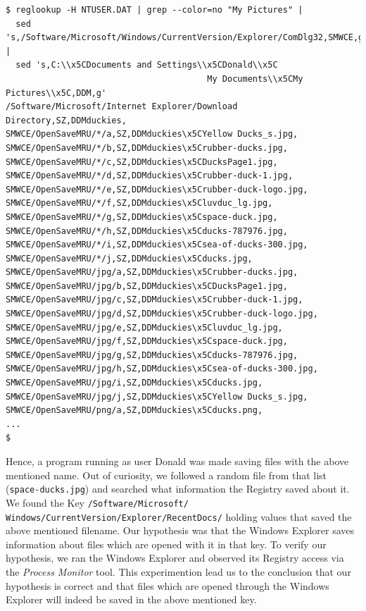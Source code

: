 \documentclass[a4paper,
    11pt,
    normalheadings,
    parindent,
    UKenglish,
    abstracton,
    ]{scrartcl}
\begin{document}
\begin{verbatim}
$ reglookup -H NTUSER.DAT | grep --color=no "My Pictures" |
  sed 's,/Software/Microsoft/Windows/CurrentVersion/Explorer/ComDlg32,SMWCE,g' |
  sed 's,C:\\x5CDocuments and Settings\\x5CDonald\\x5C
                                        My Documents\\x5CMy Pictures\\x5C,DDM,g'
/Software/Microsoft/Internet Explorer/Download Directory,SZ,DDMduckies,
SMWCE/OpenSaveMRU/*/a,SZ,DDMduckies\x5CYellow Ducks_s.jpg,
SMWCE/OpenSaveMRU/*/b,SZ,DDMduckies\x5Crubber-ducks.jpg,
SMWCE/OpenSaveMRU/*/c,SZ,DDMduckies\x5CDucksPage1.jpg,
SMWCE/OpenSaveMRU/*/d,SZ,DDMduckies\x5Crubber-duck-1.jpg,
SMWCE/OpenSaveMRU/*/e,SZ,DDMduckies\x5Crubber-duck-logo.jpg,
SMWCE/OpenSaveMRU/*/f,SZ,DDMduckies\x5Cluvduc_lg.jpg,
SMWCE/OpenSaveMRU/*/g,SZ,DDMduckies\x5Cspace-duck.jpg,
SMWCE/OpenSaveMRU/*/h,SZ,DDMduckies\x5Cducks-787976.jpg,
SMWCE/OpenSaveMRU/*/i,SZ,DDMduckies\x5Csea-of-ducks-300.jpg,
SMWCE/OpenSaveMRU/*/j,SZ,DDMduckies\x5Cducks.jpg,
SMWCE/OpenSaveMRU/jpg/a,SZ,DDMduckies\x5Crubber-ducks.jpg,
SMWCE/OpenSaveMRU/jpg/b,SZ,DDMduckies\x5CDucksPage1.jpg,
SMWCE/OpenSaveMRU/jpg/c,SZ,DDMduckies\x5Crubber-duck-1.jpg,
SMWCE/OpenSaveMRU/jpg/d,SZ,DDMduckies\x5Crubber-duck-logo.jpg,
SMWCE/OpenSaveMRU/jpg/e,SZ,DDMduckies\x5Cluvduc_lg.jpg,
SMWCE/OpenSaveMRU/jpg/f,SZ,DDMduckies\x5Cspace-duck.jpg,
SMWCE/OpenSaveMRU/jpg/g,SZ,DDMduckies\x5Cducks-787976.jpg,
SMWCE/OpenSaveMRU/jpg/h,SZ,DDMduckies\x5Csea-of-ducks-300.jpg,
SMWCE/OpenSaveMRU/jpg/i,SZ,DDMduckies\x5Cducks.jpg,
SMWCE/OpenSaveMRU/jpg/j,SZ,DDMduckies\x5CYellow Ducks_s.jpg,
SMWCE/OpenSaveMRU/png/a,SZ,DDMduckies\x5Cducks.png,
...
$
\end{verbatim}
Hence, a program running as user Donald was made saving files with the above mentioned name.
Out of curiosity, we followed a random file from that list (\texttt{space-ducks.jpg}) and searched what information the Registry saved about it.
We found the Key \linebreak[3]\texttt{/Software/Microsoft/ Windows/CurrentVersion/Explorer/RecentDocs/} holding values that saved the above mentioned filename.
Our hypothesis was that the Windows Explorer saves information about files which are opened with it in that key.
To verify our hypothesis, we ran the Windows Explorer and observed its Registry access via the \emph{Process Monitor} tool.
This experimention lead us to the conclusion that our hypothesis is correct and that files which are opened through the Windows Explorer will indeed be saved in the above mentioned key.
\end{document}
